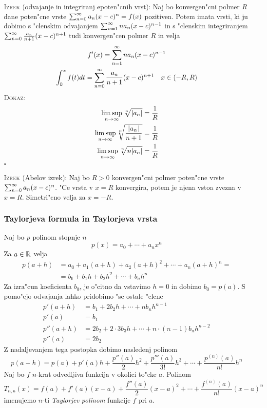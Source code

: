 %
\textsc{Izrek} (odvajanje in integriranj epoten"cnih vrst): Naj bo konvergen"cni polmer $R$ dane poten"cne vrste $\sum_{n = 0}^{\infty} a_n (x-c)^n = f(x)$ pozitiven. Potem imata vrsti, ki ju dobimo s "clenskim odvajanjem $\sum_{n = 1}^{\infty} n a_n (x - c)^{n-1}$ in s "clenskim integriranjem $\sum_{n = 0}^{\infty} \frac{a_n}{n + 1} (x - c)^{n+1}$ tudi konvergen"cen polmer $R$ in velja
\begin{gather*}
f'(x) = \sum_{n = 1}^{\infty} n a_n (x - c)^{n-1} \\
\int_0^x f(t) dt = \sum_{n = 0}^{\infty} \frac{a_n}{n + 1} (x - c)^{n + 1} \quad x \in (-R, R)
\end{gather*}
\textsc{Dokaz:}
\begin{align*}
\limsup_{n \rightarrow \infty} \sqrt[n]{|a_n|} &= \dfrac{1}{R} \\
\limsup_{n \rightarrow \infty} \sqrt[n]{\dfrac{|a_n|}{n+1}} &= \dfrac{1}{R} \\
\limsup_{n \rightarrow \infty} \sqrt[n]{n |a_n|} &= \dfrac{1}{R}
\end{align*}
\hfill $\square$

\textsc{Izrek} (Abelov izrek): Naj bo $R > 0$ konvergen"cni polmer poten"cne vrste $\sum_{n = 0}^{\infty} a_n (x - c)^n$. "Ce vrsta v $x = R$ konvergira, potem je njena vstoa zvezna v $x = R$. Simetri"cno velja za $x = -R$.

\subsubsection{Taylorjeva formula in Taylorjeva vrsta}
Naj bo $p$ polinom stopnje $n$
\begin{equation*}
p(x) = a_0 + \cdots + a_n x^n
\end{equation*}
Za $a \in \mathbb{R}$ velja
\begin{align*}
p(a+h) &= a_0 + a_1(a+h) + a_2 (a+h)^2 + \cdots + a_n (a+h)^n = \\
&= b_0 + b_1 h + b_2 h^2 + \cdots + b_n h^n
\end{align*}
Za izra"cun koeficienta $b_0$, je o"citno da vstavimo $h=0$ in dobimo $b_0 = p(a)$. S pomo"cjo odvajanja lahko pridobimo "se ostale "clene
\begin{align*}
p'(a+h) &= b_1 + 2 b_2 h + \cdots + n b_n h^{n-1} \\
p'(a) &= b_1 \\
p''(a+h) &= 2 b_2 + 2 \cdot 3 b_3 h + \cdots + n \cdot (n-1) b_n h^{n-2} \\
p''(a) &= 2 b_2
\end{align*}
Z nadaljevanjem tega postopka dobimo nasledenj polinom
\begin{equation*}
p(a+h) = p(a) + p'(a)h + \dfrac{p''(a)}{2} h^2 + \dfrac{p'''(a)}{3!} h^3 + \cdots + \dfrac{p^{(n)}(a)}{n!} h^n
\end{equation*}
%
 Naj bo $f$ $n$-krat odvedljiva funkcija v okolici to"cke $a$. Polinom
\begin{equation*}
T_{n, a}(x) = f(a) + f'(a)(x-a) + \dfrac{f''(a)}{2}(x-a)^2 + \cdots + \dfrac{f^{(n)}(a)}{n!} (x-a)^n
\end{equation*}
imenujemo $n$-ti \emph{Taylorjev polinom} funkcije $f$ pri $a$.

